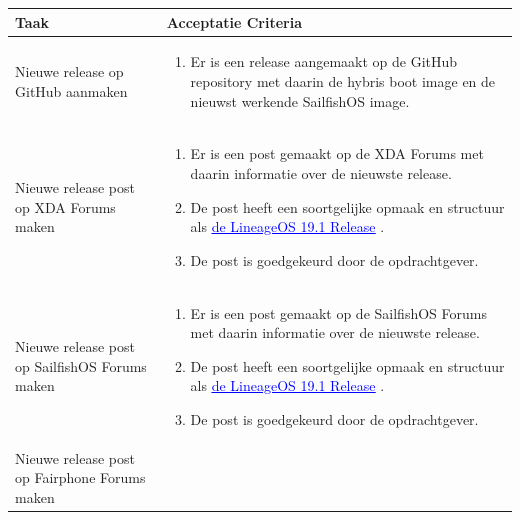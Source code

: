 \documentclass[a4paper]{report}
\newcommand{\styledhref}[2]{%
    \href{#1}{\textcolor{blue}{\underline{#2}}} %
}
\newcommand{\userstorycolor}{PeachPuff1}
\begin{document}
\begin{tcolorbox}[colback=white, coltitle=black, colframe=\userstorycolor, title=\textbf{User Story: }Als opdrachtgever wil ik dat er altijd een actieve sailfishOS build beschikbaar is\, zodat gebruikers de laatste functionaliteiten kunnen gebruiken.]
\begin{table}[H]
    \centering
  \begin{tabularx}{1\textwidth}{|X|X|}
    \hline
    \cellcolor[HTML]{ffcc99} \textbf{Taak} & \cellcolor[HTML]{ffcc99} \textbf{Acceptatie Criteria} \\ 
    \hline
    Nieuwe release op GitHub aanmaken &
     \begin{enumerate}
      \item Er is een release aangemaakt op de GitHub repository met daarin de hybris boot image en de nieuwst werkende SailfishOS image.
     \end{enumerate}
      \\
    \hline 
    Nieuwe release post op XDA Forums maken & 
    \begin{enumerate}[leftmargin=.4cm, topsep=0cm, itemsep=.2cm]
      \item Er is een post gemaakt op de XDA Forums met daarin informatie over de nieuwste release.
      \item De post heeft een soortgelijke opmaak en structuur als \styledhref{https://xdaforums.com/t/lineageos-19-1-android-12l-signature-spoofing-ota-updates-for-s8-s8-note8.4370375/}{de LineageOS 19.1 Release}.
      \item De post is goedgekeurd door de opdrachtgever.
     \end{enumerate}
    \\ 
    \hline 
    Nieuwe release post op SailfishOS Forums maken & 
    \begin{enumerate}[leftmargin=.4cm, topsep=0cm, itemsep=.2cm]
      \item Er is een post gemaakt op de SailfishOS Forums met daarin informatie over de nieuwste release.
      \item De post heeft een soortgelijke opmaak en structuur als \styledhref{https://xdaforums.com/t/lineageos-19-1-android-12l-signature-spoofing-ota-updates-for-s8-s8-note8.4370375/}{de LineageOS 19.1 Release}.
      \item De post is goedgekeurd door de opdrachtgever.
     \end{enumerate}
    \\ 
    \hline 
    Nieuwe release post op Fairphone Forums maken & 

\end{tabularx}
\end{table}
\end{tcolorbox}
\end{document}
